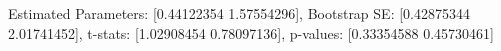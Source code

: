Estimated Parameters: [0.44122354 1.57554296], Bootstrap SE: [0.42875344 2.01741452], t-stats: [1.02908454 0.78097136], p-values: [0.33354588 0.45730461]